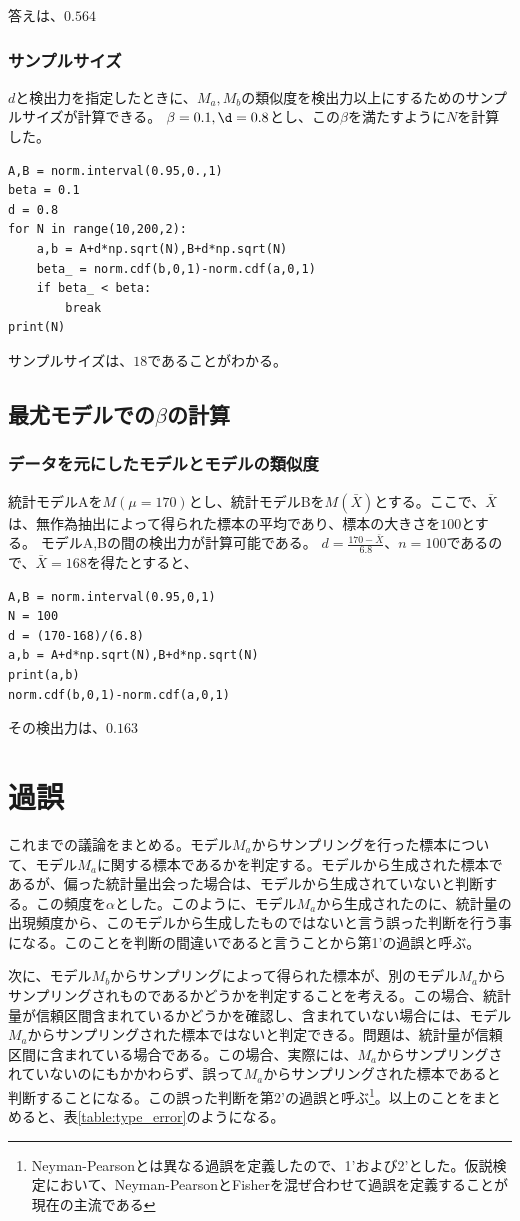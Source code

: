 答えは、$0.564$


\subsubsection{サンプルサイズ}
$d$と検出力を指定したときに、$M_a,M_b$の類似度を検出力以上にするためのサンプルサイズが計算できる。
$\beta=0.1,\d=0.8$とし、この$\beta$を満たすように$N$を計算した。

\begin{lstlisting}
A,B = norm.interval(0.95,0.,1)
beta = 0.1
d = 0.8
for N in range(10,200,2):
    a,b = A+d*np.sqrt(N),B+d*np.sqrt(N)
    beta_ = norm.cdf(b,0,1)-norm.cdf(a,0,1)
    if beta_ < beta:
        break
print(N)
\end{lstlisting}
サンプルサイズは、$18$であることがわかる。



\subsection{最尤モデルでの$\beta$の計算}
\subsubsection{データを元にしたモデルとモデルの類似度}
統計モデルAを$M(\mu=170)$とし、統計モデルBを$M(\bar{X})$とする。ここで、$\bar{X}$は、無作為抽出によって得られた標本の平均であり、標本の大きさを$100$とする。
モデルA,Bの間の検出力が計算可能である。
$d=\frac{170-\bar{X}}{6.8}$、$n=100$であるので、$\bar{X}=168$を得たとすると、
\begin{lstlisting}
A,B = norm.interval(0.95,0,1)
N = 100
d = (170-168)/(6.8)
a,b = A+d*np.sqrt(N),B+d*np.sqrt(N)
print(a,b)
norm.cdf(b,0,1)-norm.cdf(a,0,1)
\end{lstlisting}
その検出力は、$0.163$


\section{過誤}
これまでの議論をまとめる。モデル$M_a$からサンプリングを行った標本について、モデル$M_a$に関する標本であるかを判定する。モデルから生成された標本であるが、偏った統計量出会った場合は、モデルから生成されていないと判断する。この頻度を$\alpha$とした。このように、モデル$M_a$から生成されたのに、統計量の出現頻度から、このモデルから生成したものではないと言う誤った判断を行う事になる。このことを判断の間違いであると言うことから第1'の過誤と呼ぶ。

次に、モデル$M_b$からサンプリングによって得られた標本が、別のモデル$M_a$からサンプリングされものであるかどうかを判定することを考える。この場合、統計量が信頼区間含まれているかどうかを確認し、含まれていない場合には、モデル$M_a$からサンプリングされた標本ではないと判定できる。問題は、統計量が信頼区間に含まれている場合である。この場合、実際には、$M_a$からサンプリングされていないのにもかかわらず、誤って$M_a$からサンプリングされた標本であると判断することになる。この誤った判断を第2'の過誤と呼ぶ\footnote{Neyman-Pearsonとは異なる過誤を定義したので、1'および2'とした。仮説検定において、Neyman-PearsonとFisherを混ぜ合わせて過誤を定義することが現在の主流である}。以上のことをまとめると、表\ref{table:type_error}のようになる。

